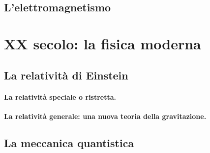 \subsection{L'elettromagnetismo}

\section{XX secolo: la fisica moderna}
\subsection{La relatività di Einstein}
\paragraph{La relatività speciale o ristretta.}
\paragraph{La relatività generale: una nuova teoria della gravitazione.}

\subsection{La meccanica quantistica}
